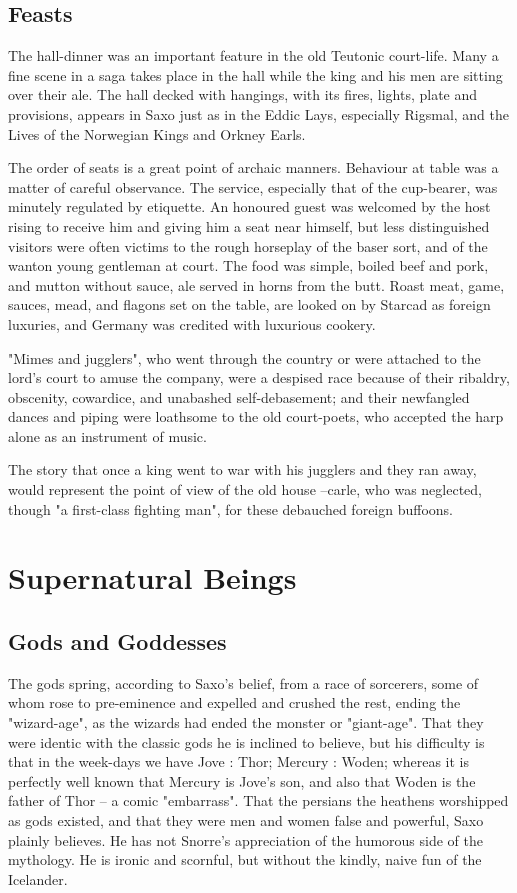 \documentclass[10pt,a4paper]{report}
\begin{document}
\section{Feasts}
The hall-dinner was an important feature in the old Teutonic court-life. Many a fine scene in a saga takes place in the hall while the king and his men are sitting over their ale. The hall decked with hangings, with its fires, lights, plate and provisions, appears in Saxo just as in the Eddic Lays, especially Rigsmal, and the Lives of the Norwegian Kings and Orkney Earls.

The order of seats is a great point of archaic manners. Behaviour at table was a matter of careful observance. The service, especially that of the cup-bearer, was minutely regulated by etiquette. An honoured guest was welcomed by the host rising to receive him and giving him a seat near himself, but less distinguished visitors were often victims to the rough horseplay of the baser sort, and of the wanton young gentleman at court. The food was simple, boiled beef and pork, and mutton without sauce, ale served in horns from the butt. Roast meat, game, sauces, mead, and flagons set on the table, are looked on by Starcad as foreign luxuries, and Germany was credited with luxurious cookery.

"Mimes and jugglers", who went through the country or were attached to the lord's court to amuse the company, were a despised race because of their ribaldry, obscenity, cowardice, and unabashed self-debasement; and their newfangled dances and piping were loathsome to the old court-poets, who accepted the harp alone as an instrument of music.

The story that once a king went to war with his jugglers and they ran away, would represent the point of view of the old house --carle, who was neglected, though "a first-class fighting man", for these debauched foreign buffoons.


\chapter{Supernatural Beings}

\section{Gods and Goddesses}
The gods spring, according to Saxo's belief, from a race of sorcerers, some of whom rose to pre-eminence and expelled and crushed the rest, ending the "wizard-age", as the wizards had ended the monster or "giant-age". That they were identic with the classic gods he is inclined to believe, but his difficulty is that in the week-days we have Jove : Thor; Mercury : Woden; whereas it is perfectly well known that Mercury is Jove's son, and also that Woden is the father of Thor -- a comic "embarrass". That the persians the heathens worshipped as gods existed, and that they were men and women false and powerful, Saxo plainly believes. He has not Snorre's appreciation of the humorous side of the mythology. He is ironic and scornful, but without the kindly, naive fun of the Icelander.\\
\end{document}
